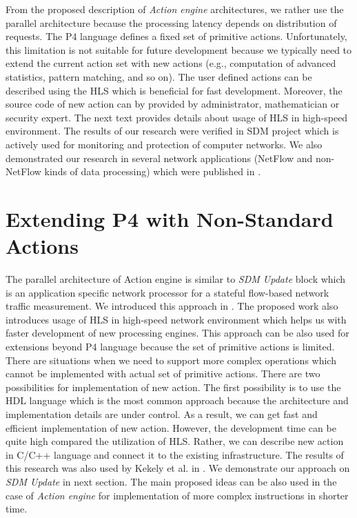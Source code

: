 From the proposed description of \textit{Action engine} architectures, we rather use the parallel architecture because the processing latency 
depends on distribution of requests. The P4 language defines a fixed set of primitive actions. 
Unfortunately, this limitation is not suitable for future development because we typically need to extend the current action set with new actions 
(e.g., computation of advanced statistics, pattern matching, and so on). The user defined actions can be described using the HLS which
is beneficial for fast development. Moreover, the source code of new action can by provided by administrator, mathematician or security expert.
The next text provides details about usage of HLS in high-speed environment.
The results of our research were verified in SDM \cite{KekelyPusKorenekSDM} project which is actively used for monitoring and protection 
of computer networks. We also demonstrated our research in several network applications 
(NetFlow and non-NetFlow kinds of data processing) which were published in 
\cite{2014hls-instructions,2014sdmcpd-monterey,2014sdmmemincs,kekely2014trade}.

\section{Extending P4 with Non-Standard Actions}
\label{sec:utilizationHlsSdmUpdate}

The parallel architecture of Action engine is similar to \textit{SDM Update} block which is an application specific network processor for
a stateful flow-based network traffic measurement. We introduced this approach in \cite{PusBenacekSDMUpdate}.
The proposed work also introduces usage of HLS in high-speed network environment which helps us with faster development of 
new processing engines. This approach can be also used for extensions beyond P4 language because the set of primitive actions is limited. 
There are situations when we need to support more complex operations which cannot be implemented with actual set of primitive actions. 
There are two possibilities for implementation of new action. The first possibility is to use the HDL language which is the 
most common approach because the architecture and implementation details are under control. As a result, we can get fast and efficient implementation
of new action. However, the development time can be quite high compared the utilization of HLS.
Rather, we can describe new action in C/C++ language and connect it to the existing infrastructure. 
The results of this research was also used by Kekely et al. in \cite{KekelyPusKorenekSdmIeeeTransactionComputerNetworks}.
We demonstrate our approach on \textit{SDM Update} in next section. 
The main proposed ideas can be also used in the case of \textit{Action engine} for implementation of more complex instructions in shorter time.

